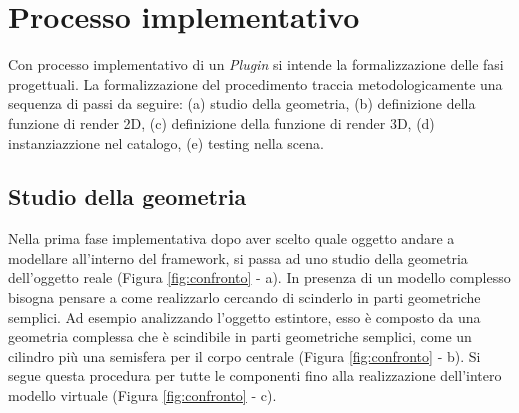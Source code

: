 \section{Processo implementativo}
\label{sec:chapter_3_section_5}

Con processo implementativo di un \emph{Plugin} si intende la formalizzazione delle fasi progettuali.
La formalizzazione del procedimento traccia metodologicamente una sequenza di passi da seguire:
(a) studio della geometria, (b) definizione della funzione di render 2D, (c) definizione della funzione di render 3D,
 (d) instanziazzione nel catalogo, (e) testing nella scena.


\subsection{Studio della geometria}
Nella prima fase implementativa dopo aver scelto quale oggetto andare a modellare all'interno del framework,
si passa ad uno studio della geometria dell'oggetto reale (Figura \ref{fig:confronto} - a).
In presenza di un modello complesso bisogna pensare a come realizzarlo cercando di scinderlo in parti geometriche semplici.
Ad esempio analizzando l'oggetto estintore, esso è composto da una geometria complessa che è scindibile in parti geometriche
semplici, come un cilindro più una semisfera per il corpo centrale (Figura \ref{fig:confronto} - b). Si segue questa procedura
per tutte le componenti fino alla realizzazione dell'intero modello virtuale (Figura \ref{fig:confronto} - c).\\

